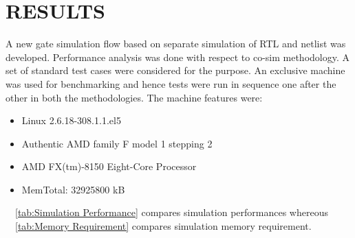 \chapter{RESULTS}
\label{chap:results.tex}
A new gate simulation flow based on separate simulation of RTL and netlist was developed. Performance analysis was done with respect to co-sim methodology. A set of standard test cases were considered for the purpose. An exclusive machine was used for benchmarking and hence tests were run in sequence one after the other in both the methodologies. The machine features were:
\begin{itemize}
\item Linux 2.6.18-308.1.1.el5
\item Authentic AMD family F model 1 stepping 2
\item AMD FX(tm)-8150 Eight-Core Processor
\item MemTotal:     32925800 kB
\end{itemize}  

~\tablename{~\ref{tab:Simulation Performance}} compares simulation performances whereous ~\tablename{~\ref{tab:Memory Requirement}} compares simulation memory requirement.


